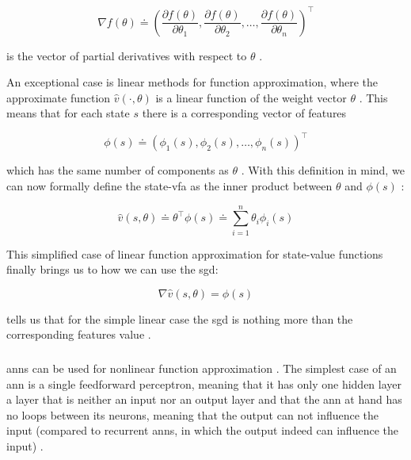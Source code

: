 \documentclass[draft=false]{seal_thesis}
\begin{document}
\begin{equation}
	\nabla f(\theta) \doteq \left( \frac{\partial f(\theta)}{\partial \theta_1}, \frac{\partial f(\theta)}{\partial \theta_2}, \ldots, \frac{\partial f(\theta)}{\partial \theta_n} \right)^\top
\end{equation}

is the vector of partial derivatives with respect to $\theta$ \citep[p. 195]{Sutton2017}.

An exceptional case is linear methods for function approximation, where the approximate function $\hat{v} (\cdot ,\theta)$ is a linear function of the weight vector $\theta$ \citep[p. 198]{Sutton2017}. This means that for each state $s$ there is a corresponding vector of features

\begin{equation}
	\phi (s) \doteq \left( \phi_1 (s), \phi_2 (s), \ldots, \phi_n (s) \right)^\top
\end{equation}

which has the same number of components as $\theta$ \citep[p. 198]{Sutton2017}. With this definition in mind, we can now formally define the state-\gls{vfa} as the inner product between $\theta$ and $\phi (s)$ \citep[p. 198]{Sutton2017}:

\begin{equation}
\label{eq:function_approximation_dot}
	\hat{v} (s,\theta) \doteq \theta^\top \phi (s) \doteq \sum_{i=1}^n \theta_i \phi_i (s)
\end{equation}

This simplified case of linear function approximation for state-value functions finally brings us to how we can use the \gls{sgd}:

\begin{equation}
\label{eq:sgd_linear}
	\nabla \hat{v} (s,\theta) = \phi (s)
\end{equation}

 tells us that for the simple linear case the \gls{sgd} is nothing more than the corresponding features value  \citep[p. 199]{Sutton2017}.

\subsubsection{}
\label{subsubsec:ann_theory}

\glspl{ann} can be used for nonlinear function approximation \citep[p. 199]{Sutton2017}. The simplest case of an \gls{ann} is a single feedforward perceptron, meaning that it has only one hidden layer \ie a layer that is neither an input nor an output layer and that the \gls{ann} at hand has no loops between its neurons, meaning that the output can not influence the input (compared to recurrent \glspl{ann}, in which the output indeed can influence the input) \citep[p. 216]{Sutton2017}. 
\end{document}
